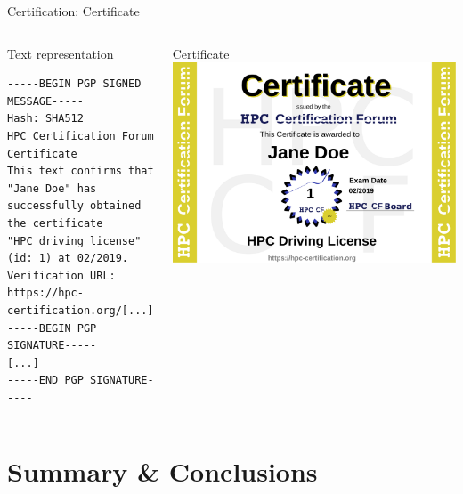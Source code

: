 \documentclass[compress,aspectratio=169]{beamer}
\begin{document}
\begin{frame}[fragile]{Certification: Certificate}
\begin{columns}
	\begin{block}{Text representation}

		\scriptsize
		\begin{verbatim}
-----BEGIN PGP SIGNED MESSAGE-----
Hash: SHA512
HPC Certification Forum Certificate
This text confirms that "Jane Doe" has
successfully obtained the certificate
"HPC driving license" (id: 1) at 02/2019.
Verification URL: https://hpc-certification.org/[...]
-----BEGIN PGP SIGNATURE-----
[...]
-----END PGP SIGNATURE-----
		\end{verbatim}
	\end{block}

	\begin{block}{Certificate}
		\medskip
		\includegraphics[width=\textwidth]{jane-doe}
	\end{block}
\end{columns}
\end{frame}



\section{Summary \& Conclusions}
\sectionIntroHidden
\end{document}
